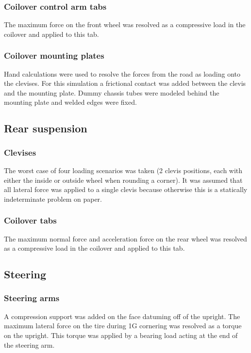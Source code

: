 \documentclass[10pt]{article}
\begin{document}
\subsubsection{Coilover control arm tabs}
The maximum force on the front wheel was resolved as a compressive load in the coilover and applied to this tab.

\subsubsection{Coilover mounting plates}
Hand calculations were used to resolve the forces from the road as loading onto the clevises. For this simulation a frictional contact was added between the clevis and the mounting plate. Dummy chassis tubes were modeled behind the mounting plate and welded edges were fixed.

\subsection{Rear suspension}
\subsubsection{Clevises}
The worst case of four loading scenarios was taken (2 clevis positions, each with either the inside or outside wheel when rounding a corner). It was assumed that all lateral force was applied to a single clevis because otherwise this is a statically indeterminate problem on paper.

\subsubsection{Coilover tabs}
The maximum normal force and acceleration force on the rear wheel was resolved as a compressive load in the coilover and applied to this tab.

\subsection{Steering}
\subsubsection{Steering arms}
A compression support was added on the face datuming off of the upright. The maximum lateral force on the tire during 1G cornering was resolved as a torque on the upright. This torque was applied by a bearing load acting at the end of the steering arm.
\end{document}

